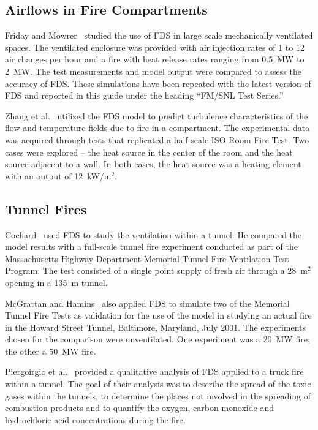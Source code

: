 \subsection{Airflows in Fire Compartments}

Friday and Mowrer~\cite{Friday:1} studied the use of FDS in large scale mechanically ventilated spaces.  The ventilated enclosure was provided with air injection rates of 1 to 12 air changes per hour and a fire with heat release rates ranging from 0.5~MW to 2~MW. The test measurements and model output were compared to assess the accuracy of FDS. These simulations have been repeated with the latest version of FDS and reported in this guide under the heading ``FM/SNL Test Series.''

Zhang et al.~\cite{Zhang:2} utilized the FDS model to predict turbulence characteristics of the flow and temperature fields due to fire in a compartment.  The experimental data was acquired through tests that replicated a half-scale ISO Room Fire Test. Two cases were explored -- the heat source in the center of the room and the heat source adjacent to a wall. In both cases, the heat source was a heating element with an output of 12~kW/m$^2$.


\subsection{Tunnel Fires}

Cochard~\cite{Cochard:1} used FDS to study the ventilation within a tunnel. He compared the model results with a full-scale tunnel fire experiment conducted as part of the Massachusetts Highway Department Memorial Tunnel Fire Ventilation Test Program. The test consisted of a single point supply of fresh air through a 28~m$^2$ opening in a 135~m tunnel.

McGrattan and Hamins~\cite{McGrattan:HST} also applied FDS to simulate two of the Memorial Tunnel Fire Tests as validation for the use of the model in studying an actual fire in the Howard Street Tunnel, Baltimore, Maryland, July 2001. The experiments chosen for the comparison were unventilated. One experiment was a 20~MW fire; the other a 50~MW fire.

Piergoirgio et al.~\cite{Piergiorgio:1} provided a qualitative analysis of FDS applied to a truck fire within a tunnel. The goal of their analysis was to describe the spread of the toxic gases within the tunnels, to determine the places not involved in the spreading of combustion products and to quantify the oxygen, carbon monoxide and hydrochloric acid concentrations during the fire.

